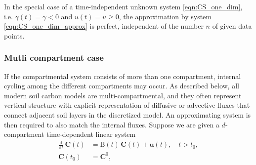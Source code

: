\documentclass[11pt,a4paper]{article}
\renewcommand{\vec}[1]{\mathbf{#1}}
\newcommand{\tens}[1]{\mathrm{#1}}
\newcommand{\deriv}[1]{\frac{\mathrm{d}}{\mathrm{d}#1}}
\begin{document}
        In the special case of a time-independent unknown system \eqref{eqn:CS_one_dim}, i.e. $\gamma(t)=\gamma<0$ and $u(t)=u\geq0$, the approximation by system \eqref{eqn:CS_one_dim_approx} is perfect, independent of the number $n$ of given data points.\\
        
    \subsubsection*{Mutli compartment case}
        If the compartmental system consists of more than one compartment, internal cycling among the different compartments may occur. As described below, all modern soil carbon models are multi-compartmental, and they often represent vertical structure with explicit representation of diffusive or advective fluxes that connect adjacent soil layers in the discretized model.
        An approximating system is then required to also match the internal fluxes.
        Suppose we are given a $d$-compartment time-dependent linear system
        \begin{equation}\label{eqn:CS_multi_dim}
            \begin{aligned}
                \deriv{t}\,\vec{C}(t) &= \tens{B}(t)\,\vec{C}(t) + \vec{u}(t),\quad t>t_0,\\
                \vec{C}(t_0) &= \vec{C}^0,
            \end{aligned}
        \end{equation}
\end{document}
